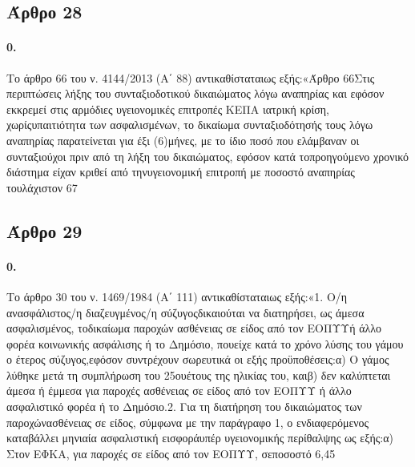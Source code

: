 \documentclass[a4paper,oneside, 10pt]{book}
\begin{document}
\subsection*{ Άρθρο 28 }
\paragraph { 0. } Το άρθρο 66 του ν. 4144/2013 (Α΄ 88) αντικαθίσταταιως εξής:«Άρθρο 66Στις περιπτώσεις λήξης του συνταξιοδοτικού δικαιώματος λόγω αναπηρίας και εφόσον εκκρεμεί στις αρμόδιες υγειονομικές επιτροπές ΚΕΠΑ ιατρική κρίση, χωρίςυπαιτιότητα των ασφαλισμένων, το δικαίωμα συνταξιοδότησής τους λόγω αναπηρίας παρατείνεται για έξι (6)μήνες, με το ίδιο ποσό που ελάμβαναν οι συνταξιούχοι πριν από τη λήξη του δικαιώματος, εφόσον κατά τοπροηγούμενο χρονικό διάστημα είχαν κριθεί από τηνυγειονομική επιτροπή με ποσοστό αναπηρίας τουλάχιστον 67%
\subsection*{ Άρθρο 29 }
\paragraph { 0. } Το άρθρο 30 του ν. 1469/1984 (Α΄ 111) αντικαθίσταταιως εξής:«1. Ο/η ανασφάλιστος/η διαζευγμένος/η σύζυγοςδικαιούται να διατηρήσει, ως άμεσα ασφαλισμένος, τοδικαίωμα παροχών ασθένειας σε είδος από τον ΕΟΠΥΥή άλλο φορέα κοινωνικής ασφάλισης ή το Δημόσιο, πουείχε κατά το χρόνο λύσης του γάμου ο έτερος σύζυγος,εφόσον συντρέχουν σωρευτικά οι εξής προϋποθέσεις:α) Ο γάμος λύθηκε μετά τη συμπλήρωση του 25ουέτους της ηλικίας του, καιβ) δεν καλύπτεται άμεσα ή έμμεσα για παροχές ασθένειας σε είδος από τον ΕΟΠΥΥ ή άλλο ασφαλιστικό φορέα ή το Δημόσιο.2. Για τη διατήρηση του δικαιώματος των παροχώνασθένειας σε είδος, σύμφωνα με την παράγραφο 1, ο ενδιαφερόμενος καταβάλλει μηνιαία ασφαλιστική εισφοράυπέρ υγειονομικής περίθαλψης ως εξής:α) Στον ΕΦΚΑ, για παροχές σε είδος από τον ΕΟΠΥΥ, σεποσοστό 6,45%
\end{document}

